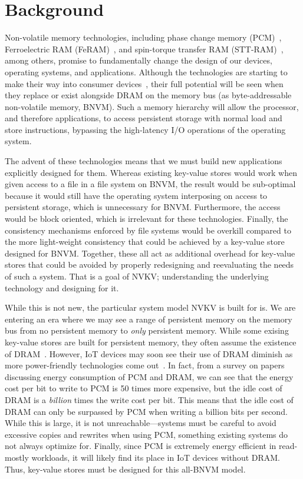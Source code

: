 \section{Background}

Non-volatile memory technologies, including phase change memory
(PCM)~\cite{lee_architecting_2009,wong2010phase}, Ferroelectric RAM
(FeRAM)~\cite{fox:2001feram}, and spin-torque transfer RAM (STT-RAM)~\cite{sttram},
among others, promise to fundamentally change the design of our
devices, operating systems, and applications. Although the technologies are
starting to make their way into consumer devices~\cite{intel3dxpoint}, their
full potential will be seen when they replace or exist alongside DRAM on the
memory bus (as byte-addressable non-volatile memory, BNVM).
Such a memory hierarchy will allow the processor, and therefore
applications, to access persistent storage with normal load and store
instructions, bypassing the high-latency I/O operations of the operating system.

The advent of these technologies means that we must build new applications
explicitly designed for them. Whereas existing key-value stores would work when
given access to a file in a file system on BNVM, the result would be sub-optimal
because it would still have the operating system interposing on access to
persistent storage, which is unnecessary for BNVM. Furthermore, the access would
be block oriented, which is irrelevant for these technologies. Finally, the
consistency mechanisms enforced by file systems would be overkill compared to
the more light-weight consistency that could be achieved by a key-value store
designed for BNVM. Together, these all act as additional overhead for key-value
stores that could be avoided by properly redesigning and reevaluating the needs
of such a system. That is a goal of NVKV; understanding the underlying
technology and designing for it.

While this is not new, the particular system model NVKV is built for is. We are
entering an era where we may see a range of persistent memory on the memory bus
from no persistent memory to \textit{only} persistent memory. While some exising
key-value stores are built for persistent memory, they often assume the
existence of DRAM~\cite{echo,Arulraj:2016wbl}. However, IoT devices may soon see
their use of DRAM diminish as more power-friendly technologies come
out~\cite{Jayakumar2014powering}. In fact, from a survey on
papers~\cite{dhiman_pdram:_2009,lee_architecting_2009,xiangyu_dong_nvsim:_2012,qureshi_scalable_2009,Chen_rethinkingdatabase,bedeschi_8mb_2004} discussing
energy consumption of PCM and DRAM, we can see that the energy cost per bit to
write to PCM is 50 times more expensive, but
the idle cost of DRAM is a \textit{billion} times the write cost per bit. This
means that the idle cost of DRAM can only be surpassed by PCM when writing a
billion bits per second. While this is large, it is not unreachable---systems
must be careful to avoid excessive copies and rewrites when using PCM, something 
existing systems do not always optimize for. Finally, since PCM is
extremely energy efficient in read-mostly workloads, it will likely find its
place in IoT devices without DRAM. Thus, key-value stores must be designed for
this all-BNVM model.

